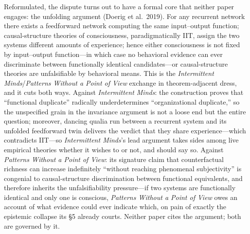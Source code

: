 \documentclass[11pt]{article}
\newcommand{\IM}{\emph{Intermittent Minds}}
\newcommand{\PP}{\emph{Patterns Without a Point of View}}
\begin{document}
Reformulated, the dispute turns out to have a formal core that neither paper engages: the unfolding argument (Doerig et al.\ 2019). For any recurrent network there exists a feedforward network computing the same input--output function; causal-structure theories of consciousness, paradigmatically IIT, assign the two systems different amounts of experience; hence either consciousness is not fixed by input--output function---in which case no behavioral evidence can ever discriminate between functionally identical candidates---or causal-structure theories are unfalsifiable by behavioral means. This is the \IM{}/\PP{} exchange in theorem-adjacent dress, and it cuts both ways. Against \IM{}: the construction proves that ``functional duplicate'' radically underdetermines ``organizational duplicate,'' so the unspecified grain in the invariance argument is not a loose end but the entire question; moreover, dancing qualia run between a recurrent system and its unfolded feedforward twin delivers the verdict that they share experience---which contradicts IIT---so \IM{}'s lead argument takes sides among live empirical theories whether it wishes to or not, and should say so. Against \PP{}: its signature claim that counterfactual richness can increase indefinitely ``without reaching phenomenal subjectivity'' is congenial to causal-structure discrimination between functional equivalents, and therefore inherits the unfalsifiability pressure---if two systems are functionally identical and only one is conscious, \PP{} owes an account of what evidence could ever indicate which, on pain of exactly the epistemic collapse its \S 5 already courts. Neither paper cites the argument; both are governed by it.
\end{document}
